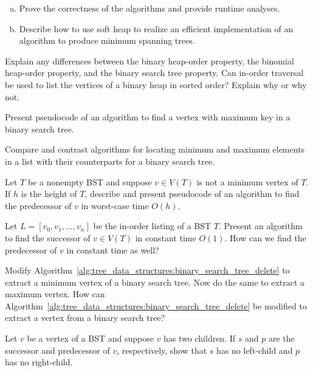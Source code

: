 \begin{problem}
\begin{enumerate}[(a)]
  \item Prove the correctness of the algorithms and provide runtime
    analyses.

  \item Describe how to use soft heap to realize an efficient
    implementation of an algorithm to produce minimum spanning trees.
  \end{enumerate}

\item Explain any differences between the binary
  heap-order property, the
  binomial heap-order
  property, and the binary
  search tree property. Can
  in-order traversal be used to list the vertices of a binary heap in
  sorted order? Explain why or why not.

\item Present pseudocode of an algorithm to find a vertex with maximum
  key in a binary search tree.

\item Compare and contrast algorithms for locating minimum and maximum
  elements in a list with their counterparts for a binary search tree.

\item Let $T$ be a nonempty BST and suppose $v \in V(T)$ is not a
  minimum vertex of $T$. If $h$ is the height of $T$, describe and
  present pseudocode of an algorithm to find the predecessor of $v$ in
  worst-case time $O(h)$.

\item Let $L = [v_0, v_1, \dots, v_n]$ be the in-order listing of a
  BST $T$. Present an algorithm to find the successor of
  $v \in V(T)$ in constant time $O(1)$. How can we find the
  predecessor of $v$ in constant time as well?

\item Modify
  Algorithm~\ref{alg:tree_data_structures:binary_search_tree_delete}
  to extract a minimum vertex of a binary search tree. Now do the same
  to extract a maximum vertex. How can
  Algorithm~\ref{alg:tree_data_structures:binary_search_tree_delete}
  be modified to extract a vertex from a binary search tree?

\item Let $v$ be a vertex of a BST and suppose $v$ has two
  children. If $s$ and $p$ are the successor and predecessor of $v$,
  respectively, show that $s$ has no left-child and $p$ has no
  right-child.


\end{problem}
